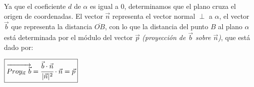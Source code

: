 Ya que el coeficiente $d$ de $\alpha$ es igual a $0$, determinamos que el plano cruza el origen de coordenadas. El vector $\vec{n}$ representa el vector normal $\perp$ a $\alpha$, el vector $\vec{b}$ que representa la distancia $\overline{OB}$, con lo que la distancia del punto $B$ al plano $\alpha$ está determinada por el módulo del vector $\vec{p}$ \textit{(proyección de $\vec{b}$ sobre $\vec{n}$)}, que está dado por:

\begin{center}
	$\boxed{\overrightarrow{Proy_{\vec{n}} \ \vec{b}} = \cfrac{\vec{b} \cdot \vec{n}}{|\vec{n}|^2} \cdot \vec{n} = \vec{p}}$
\end{center}



